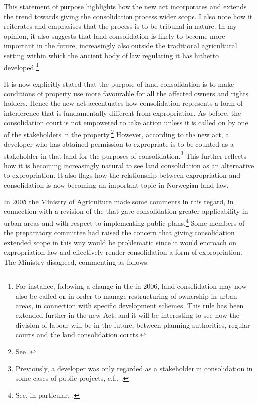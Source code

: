 This statement of purpose highlights how the new act incorporates and extends the trend towards giving the consolidation process wider scope. I also note how it reiterates and emphasises that the process is to be tribunal in nature. In my opinion, it also suggests that land consolidation is likely to become more important in the future, increasingly also outside the traditional agricultural setting within which the ancient body of law regulating it has hitherto developed.\footnote{For instance, following a change in the \cite{lca79} in 2006, land consolidation may now also be called on in order to manage restructuring of ownership in urban areas, in connection with specific development schemes. This rule has been extended further in the new Act, and it will be interesting to see how the division of labour will be in the future, between planning authorities, regular courts and the land consolidation courts.}

It is now explicitly stated that the purpose of land consolidation is to make conditions of property use more favourable for all the affected owners and rights holders. Hence the new act accentuates how consolidation represents a form of interference that is fundamentally different from expropriation. As before, the consolidation court is not empowered to take action unless it is called on by one of the stakeholders in the property.\footnote{See \cite[1-5]{lca13}.} However, according to the new act, a developer who has obtained permission to expropriate is to be counted as a stakeholder in that land for the purposes of consolidation.\footnote{Previously, a developer was only regarded as a stakeholder in consolidation in some cases of public projects, c.f., \cite[5|88|88 a)]{lca79}.} This further reflects how it is becoming increasingly natural to see land consolidation as an alternative to expropriation. It also flags how the relationship between expropriation and consolidation is now becoming an important topic in Norwegian land law.

In 2005 the Ministry of Agriculture made some comments in this regard, in connection with a revision of the \cite{lca79} that gave consolidation greater applicability in urban areas and with respect to implementing public plans.\footnote{See, in particular, \cite[2 h-i)]{lca79}.} Some members of the preparatory committee had raised the concern that giving consolidation extended scope in this way would be problematic since it would encroach on expropriation law and effectively render consolidation a form of expropriation. The Ministry disagreed, commenting as follows.

